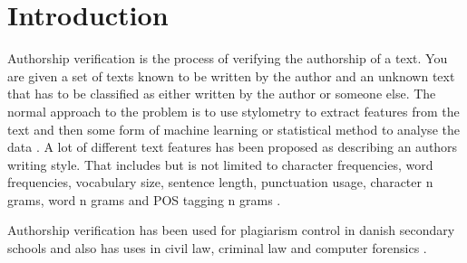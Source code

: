 \section{Introduction}
Authorship verification is the process of verifying the authorship of a text.
You are given a set of texts known to be written by the author and an unknown
text that has to be classified as either written by the author or someone else.
The normal approach to the problem is to use stylometry to extract features from
the text and then some form of machine learning or statistical method to analyse
the data \cite{stamatos2009}. A lot of different text features has been proposed
as describing an authors writing style. That includes but is not limited to
character frequencies, word frequencies, vocabulary size, sentence length,
punctuation usage, character n grams, word n grams and \gls{POS} tagging n grams
\cite{stamatos2009}.

Authorship verification has been used for plagiarism control in danish secondary
schools \cite{hansen2014} and also has uses in civil law, criminal law and
computer forensics \cite{stamatos2009}.
